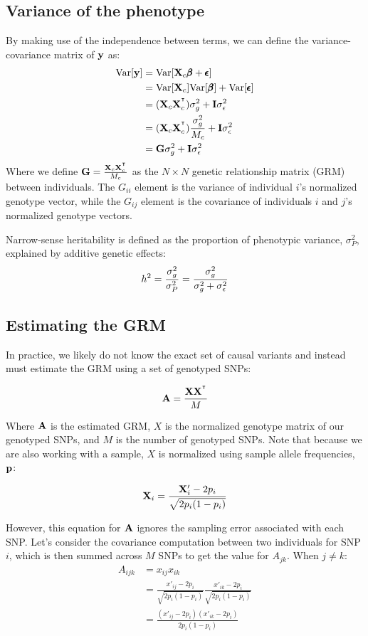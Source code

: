 \documentclass[12pt]{article}
\begin{document}
\subsection{Variance of the phenotype}
By making use of the independence between terms, we can define the variance-covariance matrix of $\mathbf{y}$ as:
\begin{align*}
    \mathrm{Var}[\mathbf{y}] &= \mathrm{Var}[\mathbf{X}_c \pmb{\beta} + \pmb{\epsilon}] \\
    &= \mathrm{Var}[\mathbf{X}_c] \mathrm{Var}[\pmb{\beta}] + \mathrm{Var}[\pmb{\epsilon}] \\
    &= (\mathbf{X}_c \mathbf{X}_c^{^\intercal}) \sigma_g^2 + \mathbf{I} \sigma_{\epsilon}^2 \\
    &= (\mathbf{X}_c \mathbf{X}_c^{^\intercal}) \frac{\sigma_g^2}{M_c} + \mathbf{I} \sigma_{\epsilon}^2 \\
    &= \mathbf{G} \sigma_g^2 + \mathbf{I} \sigma_{\epsilon}^2 \\
\end{align*}
Where we define $\mathbf{G} = \frac{\mathbf{X}_c \mathbf{X}_c^{^\intercal}}{M_c}$ as the $N \times N$ genetic relationship matrix (GRM) between individuals.
The $G_{ii}$ element is the variance of individual $i$'s normalized genotype vector, while the $G_{ij}$ element is the covariance of individuals $i$ and $j$'s normalized genotype vectors.

Narrow-sense heritability is defined as the proportion of phenotypic variance, $\sigma_P^2$, explained by additive genetic effects:
$$ h^2 = \frac{\sigma_g^2}{\sigma_P^2} = \frac{\sigma_g^2}{\sigma_g^2 + \sigma_{\epsilon}^2} $$

\subsection{Estimating the GRM}

In practice, we likely do not know the exact set of causal variants and instead must estimate the GRM using a set of genotyped SNPs:

$$ \mathbf{A} = \frac{\mathbf{X} \mathbf{X}^{^\intercal}}{M} $$

Where $\mathbf{A}$ is the estimated GRM, $X$ is the normalized genotype matrix of our genotyped SNPs, and $M$ is the number of genotyped SNPs.
Note that because we are also working with a sample, $X$ is normalized using sample allele frequencies, $\mathbf{p}$:

$$ \mathbf{X}_i = \frac{\mathbf{X}'_i - 2 p_i}{\sqrt{2 p_i (1 - p_i)}} $$

However, this equation for $\mathbf{A}$ ignores the sampling error associated with each SNP.
Let's consider the covariance computation between two individuals for SNP $i$, which is then summed across $M$ SNPs to get the value for $A_{jk}$.
When $j \neq k$:
\begin{align*}
    A_{ijk} &= x_{ij} x_{ik} \\
    &= \frac{x'_{ij} - 2 p_i}{\sqrt{2 p_i (1 - p_i)}}
    \frac{x'_{ik} - 2 p_i}{\sqrt{2 p_i (1 - p_i)}} \\
    &= \frac{(x'_{ij} - 2 p_i)(x'_{ik} - 2 p_i)}{2 p_i (1 - p_i)}
\end{align*}
\end{document}
